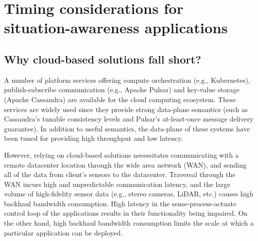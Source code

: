 \section{Timing considerations for situation-awareness applications}
\subsection{Why cloud-based solutions fall short?}
A number of platform services offering compute orchestration (e.g., Kubernetes), publish-subscribe communication (e.g., Apache Pulsar) and key-value storage (Apache Cassandra) are available for the cloud computing ecosystem. These services are widely used since they provide strong data-plane semantics (such as Cassandra's tunable consistency levels and Pulsar's at-least-once message delivery guarantee). In addition to useful semantics, the data-plane of these systems have been tuned for providing high throughput and low latency. 
\par However, relying on cloud-based solutions necessitates communicating with a remote datacenter location through the wide area network (WAN), and sending all of the data from client's sensors to the datacenter. Traversal through the WAN incurs high and unpredictable communication latency, and the large volume of high-fidelity sensor data (e.g., stereo cameras, LiDAR, etc.) causes high backhaul bandwidth consumption. High latency in the sense-process-actuate control loop of the applications results in their functionality being impaired. On the other hand, high backhaul bandwidth consumption limits the scale at which a particular application can be deployed.

